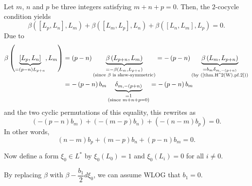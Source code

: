 \documentclass
[numbers=enddot,12pt,final,onecolumn,german,notitlepage]{scrartcl}%
\theoremstyle{definition}
\begin{document}
Let $m$, $n$ and $p$ be three integers satisfying $m+n+p=0$. Then, the
$2$-cocycle condition yields%
\[
\beta\left(  \left[  L_{p},L_{n}\right]  ,L_{m}\right)  +\beta\left(  \left[
L_{m},L_{p}\right]  ,L_{n}\right)  +\beta\left(  \left[  L_{n},L_{m}\right]
,L_{p}\right)  =0.
\]
Due to%
\begin{align*}
\beta\left(  \underbrace{\left[  L_{p},L_{n}\right]  }_{=\left(  p-n\right)
L_{p+n}},L_{m}\right)   &  =\left(  p-n\right)  \underbrace{\beta\left(
L_{p+n},L_{m}\right)  }_{\substack{=-\beta\left(  L_{m},L_{p+n}\right)
\\\text{(since }\beta\text{ is skew-symmetric)}}}=-\left(  p-n\right)
\underbrace{\beta\left(  L_{m},L_{p+n}\right)  }_{\substack{=b_{m}%
\delta_{m,-\left(  p+n\right)  }\\\text{(by (\ref{thm.H^2(W).pf.2}))}}}\\
&  =-\left(  p-n\right)  b_{m}\underbrace{\delta_{m,-\left(  p+n\right)  }%
}_{\substack{=1\\\text{(since }m+n+p=0\text{)}}}=-\left(  p-n\right)  b_{m}%
\end{align*}
and the two cyclic permutations of this equality, this rewrites as%
\[
\left(  -\left(  p-n\right)  b_{m}\right)  +\left(  -\left(  m-p\right)
b_{n}\right)  +\left(  -\left(  n-m\right)  b_{p}\right)  =0.
\]
In other words,%
\begin{equation}
\left(  n-m\right)  b_{p}+\left(  m-p\right)  b_{n}+\left(  p-n\right)
b_{m}=0. \label{thm.H^2(W).pf.3}%
\end{equation}


Now define a form $\xi_{0}\in L^{\ast}$ by $\xi_{0}\left(  L_{0}\right)  =1$
and $\xi_{0}\left(  L_{i}\right)  =0$ for all $i\neq0$.

By replacing $\beta$ with $\beta-\dfrac{b_{1}}{2}d\xi_{0}$, we can assume WLOG
that $b_{1}=0$.
\end{document}

